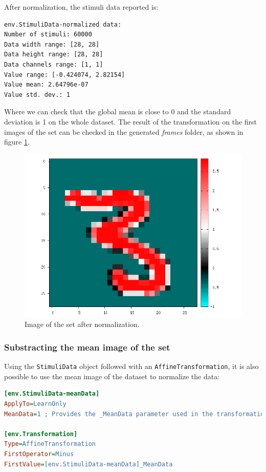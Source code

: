 \documentclass[a4paper,11pt,oneside]{article}
\begin{document}
After normalization, the stimuli data reported is:
\begin{lstlisting}[style=console]
env.StimuliData-normalized data:
Number of stimuli: 60000
Data width range: [28, 28]
Data height range: [28, 28]
Data channels range: [1, 1]
Value range: [-0.424074, 2.82154]
Value mean: 2.64796e-07
Value std. dev.: 1
\end{lstlisting}

Where we can check that the global mean is close to 0 and the standard deviation
 is 1 on the whole dataset. The result of the transformation on the first images
 of the set can be checked in the generated \emph{frames} folder, as shown in
 figure \ref{fig:frame0Mean1StdDev}.

\begin{figure}[!htb]
  \centering
  \includegraphics[width=0.8\linewidth]{figs/frame0Mean1StdDev.png}
  \caption{Image of the set after normalization.}
  \label{fig:frame0Mean1StdDev}
\end{figure}


\subsubsection{Substracting the mean image of the set}

Using the \lstinline!StimuliData! object followed with an
\lstinline!AffineTransformation!, it is also possible to use the mean image of
 the dataset to normalize the data:
\begin{lstlisting}[language=ini]
[env.StimuliData-meanData]
ApplyTo=LearnOnly
MeanData=1 ; Provides the _MeanData parameter used in the transformation

[env.Transformation]
Type=AffineTransformation
FirstOperator=Minus
FirstValue=[env.StimuliData-meanData]_MeanData
\end{lstlisting}
\end{document}

